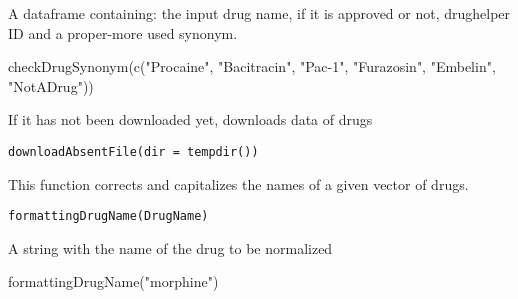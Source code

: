 \documentclass[a4paper]{book}
\begin{document}
%
\begin{Value}
A dataframe containing: the input drug name, if it is approved or not, drughelper ID and a proper-more used synonym.
\end{Value}
%
\begin{Examples}
\begin{ExampleCode}
checkDrugSynonym(c("Procaine", "Bacitracin", "Pac-1", "Furazosin", "Embelin", "NotADrug"))
\end{ExampleCode}
\end{Examples}
%
\begin{Description}\relax
If it has not been downloaded yet, downloads data of drugs
\end{Description}
%
\begin{Usage}
\begin{verbatim}
downloadAbsentFile(dir = tempdir())
\end{verbatim}
\end{Usage}
%
\begin{Description}\relax
This function corrects and capitalizes the names of a given vector of drugs.
\end{Description}
%
\begin{Usage}
\begin{verbatim}
formattingDrugName(DrugName)
\end{verbatim}
\end{Usage}
%
\begin{Arguments}
\begin{ldescription}
\item[\code{DrugName}] A string with the name of the drug to be normalized
\end{ldescription}
\end{Arguments}
%
\begin{Examples}
\begin{ExampleCode}
formattingDrugName("morphine")
\end{ExampleCode}
\end{Examples}
\printindex{}
\end{document}
